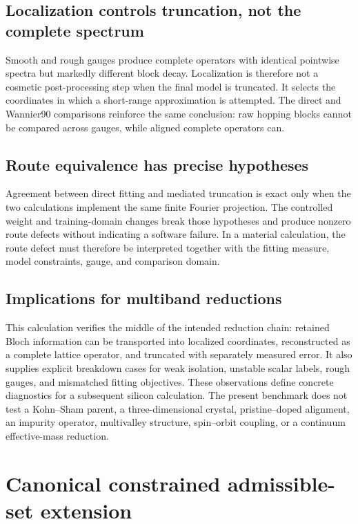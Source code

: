 \subsection{Localization controls truncation, not the complete spectrum}

Smooth and rough gauges produce complete operators with identical pointwise
spectra but markedly different block decay. Localization is therefore not a
cosmetic post-processing step when the final model is truncated. It selects the
coordinates in which a short-range approximation is attempted. The direct and
Wannier90 comparisons reinforce the same conclusion: raw hopping blocks cannot
be compared across gauges, while aligned complete operators can.

\subsection{Route equivalence has precise hypotheses}

Agreement between direct fitting and mediated truncation is exact only when the
two calculations implement the same finite Fourier projection. The controlled
weight and training-domain changes break those hypotheses and produce nonzero
route defects without indicating a software failure. In a material
calculation, the route defect must therefore be interpreted together with the
fitting measure, model constraints, gauge, and comparison domain.

\subsection{Implications for multiband reductions}

This calculation verifies the middle of the intended reduction chain: retained
Bloch information can be transported into localized coordinates, reconstructed
as a complete lattice operator, and truncated with separately measured error.
It also supplies explicit breakdown cases for weak isolation, unstable scalar
labels, rough gauges, and mismatched fitting objectives. These observations
define concrete diagnostics for a subsequent silicon calculation. The present
benchmark does not test a
Kohn--Sham parent, a three-dimensional crystal, pristine--doped alignment, an
impurity operator, multivalley structure, spin--orbit coupling, or a continuum
effective-mass reduction.

\section{Canonical constrained admissible-set extension}
\label{sec:appendix-g-m3}

